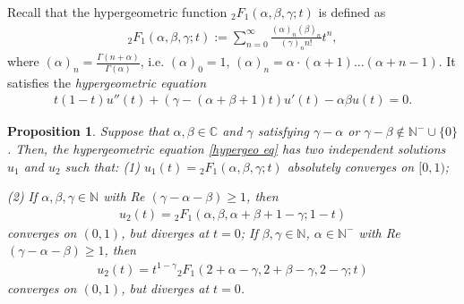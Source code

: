 \documentclass[a4paper,11pt]{amsart}
\numberwithin{equation}{section}
\newtheorem{prop}{Proposition}[section]
\begin{document}
Recall that the hypergeometric function ${}_2F_1(\alpha,\beta,\gamma;t)$ is defined as
\begin{equation}\begin{aligned}\label{2F1}
{}_2F_1(\alpha,\beta,\gamma;t):=\sum_{n=0}^{\infty}\frac{(\alpha)_n(\beta)_n}{(\gamma)_n n!}t^n,
\end{aligned}\end{equation}
 where $(\alpha)_n=\frac{\Gamma(n+\alpha)}{\Gamma(\alpha)}$, i.e. $(\alpha)_0=1$, $(\alpha)_n=\alpha\cdot(\alpha+1)\dots(\alpha+n-1)$. It satisfies the {\it hypergeometric equation}
\begin{equation}\begin{aligned}\label{hypergeo eq}
t(1-t)u''(t)+ (\gamma-(\alpha+\beta+1)t)u'(t)- \alpha\beta u(t)=0.
\end{aligned}\end{equation}
\begin{prop}\cite[Section 2.1.3 (12), Section 2.2.2]{Er}\label{hypergeo}
Suppose that $\alpha,\beta\in \mathbb{C}$ and $\gamma$ satisfying $\gamma-\alpha$ or $\gamma-\beta \notin \mathbb{N}^{-}\cup\{0\}$. Then, the hypergeometric equation \eqref{hypergeo eq} has two independent solutions $u_1$ and $u_2$ such that: (1) $u_1(t)={}_2F_1(\alpha,\beta,\gamma;t)$ absolutely converges on $[0,1)$;

(2) If $\alpha,\beta,\gamma\in \mathbb{N}$ with Re $(\gamma-\alpha-\beta)\geq 1$, then
\begin{equation}\begin{aligned}
u_2(t)={}_2F_1(\alpha,\beta,\alpha+\beta+1-\gamma;1-t)
\end{aligned}\end{equation}
converges on $(0,1)$, but diverges at $t=0$; If $\beta,\gamma\in \mathbb{N}$, $\alpha\in \mathbb{N}^{-}$ with Re $(\gamma-\alpha-\beta)\geq 1$, then
\begin{equation}\begin{aligned}
u_2(t)=t^{1-\gamma}{}_2F_1(2+\alpha-\gamma,2+\beta-\gamma,2-\gamma;t)
\end{aligned}\end{equation}
converges on $(0,1)$, but diverges at $t=0$.
\end{prop}
\end{document}
